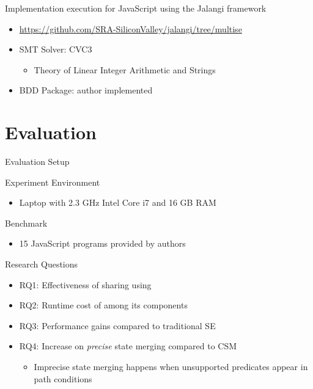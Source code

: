 \documentclass[xcolor={dvipsnames,table},16pt]{beamer}
\begin{document}
\begin{frame}{Implementation}
	\MultiSE execution for JavaScript using the Jalangi framework
	\begin{itemize}
		\item \url{https://github.com/SRA-SiliconValley/jalangi/tree/multise}
		\item SMT Solver: CVC3
		\begin{itemize}
			\item Theory of Linear Integer Arithmetic and Strings
		\end{itemize}
		\item BDD Package: author implemented
	\end{itemize}
\end{frame}

\section{Evaluation}\label{sec:eval}

\begin{frame}{Evaluation Setup}

Experiment Environment
\begin{itemize}
	\item Laptop with 2.3 GHz Intel Core i7 and 16 GB RAM
\end{itemize}

Benchmark
\begin{itemize}
	\item 15 JavaScript programs provided by authors
\end{itemize}

Research Questions
\begin{itemize}
	\item RQ1: Effectiveness of sharing using \ValSums
	\item RQ2: Runtime cost of \MultiSE among its components 
	\item RQ3: Performance gains compared to traditional SE
	\item RQ4: Increase on \emph{precise} state merging compared to CSM
	\begin{itemize}
		\item Imprecise state merging happens when unsupported predicates appear in path conditions
	\end{itemize}
\end{itemize}

\end{frame}
\end{document}
